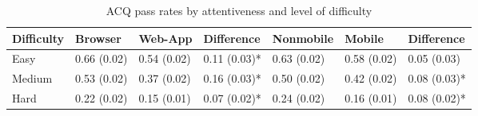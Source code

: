 \begin{table}

\caption{ACQ pass rates by attentiveness and level of difficulty}
\centering
\begin{tabular}[t]{lllllll}
\toprule
Difficulty & Browser & Web-App & Difference & Nonmobile & Mobile & Difference\\
\midrule
Easy & 0.66 (0.02) & 0.54 (0.02) & 0.11 (0.03)* & 0.63 (0.02) & 0.58 (0.02) & 0.05 (0.03)\\
Medium & 0.53 (0.02) & 0.37 (0.02) & 0.16 (0.03)* & 0.50 (0.02) & 0.42 (0.02) & 0.08 (0.03)*\\
Hard & 0.22 (0.02) & 0.15 (0.01) & 0.07 (0.02)* & 0.24 (0.02) & 0.16 (0.01) & 0.08 (0.02)*\\
\bottomrule
\end{tabular}
\end{table}
